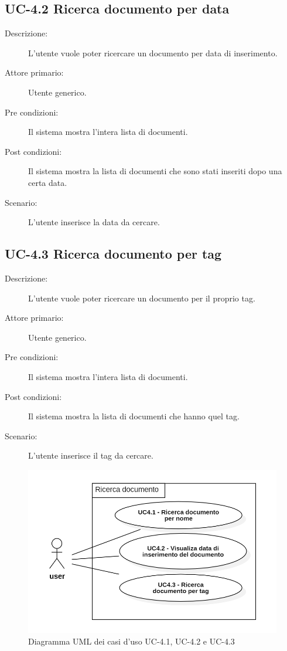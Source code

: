 \subsection{UC-4.2 Ricerca documento per data}
\begin{description}
    \item[Descrizione:] L’utente vuole poter ricercare un documento per data di inserimento.
    \item[Attore primario:] Utente generico.
    \item[Pre condizioni:] Il sistema mostra l’intera lista di documenti.
    \item[Post condizioni:] Il sistema mostra la lista di documenti che sono stati inseriti dopo una certa data.
    \item[Scenario:] L’utente inserisce la data da cercare.
\end{description}

\subsection{UC-4.3 Ricerca documento per tag}
\begin{description}
    \item[Descrizione:] L’utente vuole poter ricercare un documento per il proprio tag.
    \item[Attore primario:] Utente generico.
    \item[Pre condizioni:] Il sistema mostra l’intera lista di documenti.
    \item[Post condizioni:] Il sistema mostra la lista di documenti che hanno quel tag.
    \item[Scenario:] L’utente inserisce il tag da cercare.
\end{description}

\begin{figure}[H]
    \centering
    \includegraphics[width=0.8\linewidth]{UC4.1-2-3.PNG}
    \caption{Diagramma UML dei casi d'uso UC-4.1, UC-4.2 e UC-4.3}
    \label{fig:UC4.1-2-3}
\end{figure}

